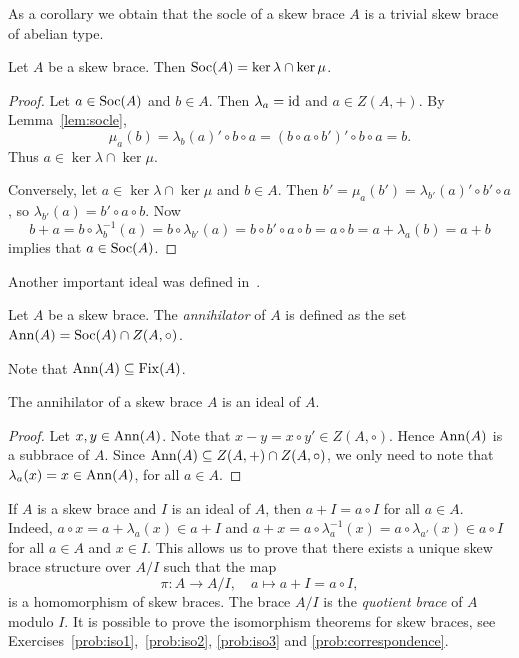 As a corollary we obtain that the socle of a skew brace $A$ is a trivial skew brace of abelian type. 

\begin{proposition}
    \label{pro:soc_kernels}
    Let $A$ be a skew brace. Then $\operatorname{Soc}(A)=\ker\lambda\cap\ker\mu$.
\end{proposition}

\begin{proof}
    Let $a\in\operatorname{Soc}(A)$ and $b\in A$. Then $\lambda_a=\operatorname{id}$ and $a\in Z(A,+)$. By Lemma~\ref{lem:socle}, \[\mu_a(b)=\lambda_b(a)'\circ b\circ a=(b\circ a\circ b')'\circ b\circ a=b.\]  Thus $a\in\ker\lambda\cap\ker\mu$. 
    
    Conversely, let $a\in\ker\lambda\cap\ker\mu$ and $b\in A$. Then $b'=\mu_a(b')=\lambda_{b'}(a)'\circ b'\circ a$, so
    $\lambda_{b'}(a)=b'\circ a\circ b$. Now 
    \[
    b+a=b\circ\lambda^{-1}_b(a)=b\circ\lambda_{b'}(a)=b\circ b'\circ a\circ b=a\circ b=a+\lambda_a(b)=a+b
    \]
    implies that $a\in\operatorname{Soc}(A)$. 
\end{proof}

Another important ideal was defined in~\cite{MR3917122}.

\begin{definition}
Let $A$ be a skew brace. The \emph{annihilator} of $A$ is 
defined as the set $\operatorname{Ann}(A)=\operatorname{Soc}(A)\cap Z(A,\circ)$. 
\end{definition}

Note that $\operatorname{Ann}(A)\subseteq\operatorname{Fix}(A)$. 

\begin{proposition}
The annihilator of a skew brace $A$ is an ideal of $A$. 
\end{proposition}

\begin{proof}
    Let $x,y\in\operatorname{Ann}(A)$. Note that $x-y=x\circ y'\in Z(A,\circ)$. Hence $\operatorname{Ann}(A)$ is a subbrace of $A$. Since $\operatorname{Ann}(A)\subseteq Z(A,+)\cap Z(A,\circ)$, 
    we only need to note that $\lambda_a(x)=x\in\operatorname{Ann}(A)$, for all $a\in A$. 
\end{proof}




If $A$ is a skew brace and $I$ is an ideal of $A$, then $a+I=a\circ I$ for all $a\in A$. Indeed, 
$a\circ x=a+\lambda_a(x)\in a+I$ and 
$a+x=a\circ\lambda_a^{-1}(x)=a\circ\lambda_{a'}(x)\in a\circ I$ 
for all $a\in A$ and $x\in I$. 
This allows us to prove that there exists a unique skew brace structure over $A/I$ such that
the map 
\[
\pi\colon A\to A/I,
\quad
a\mapsto a+I=a\circ I,
\]
is a homomorphism of skew braces. The brace $A/I$ is the \emph{quotient brace} of $A$ modulo $I$. It is possible
to prove the isomorphism theorems for skew braces, see Exercises~\ref{prob:iso1},~\ref{prob:iso2}, \ref{prob:iso3} and
\ref{prob:correspondence}.

